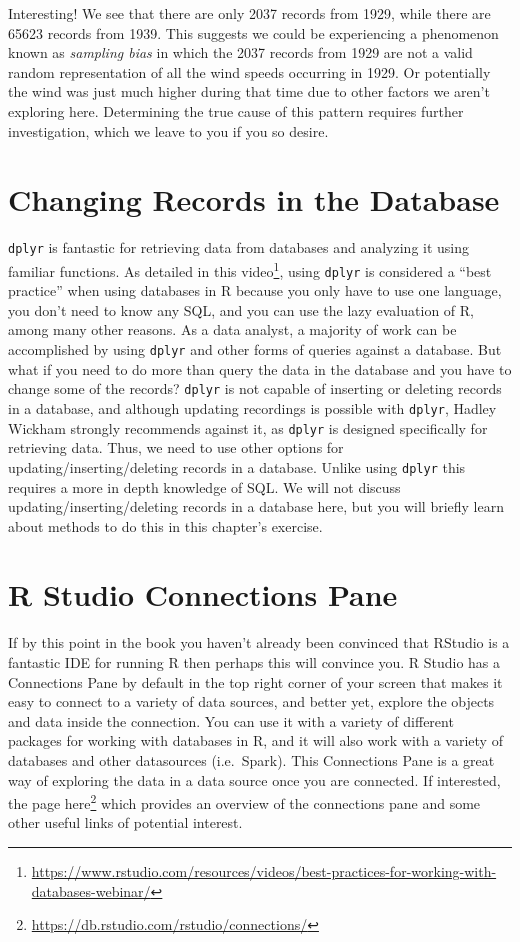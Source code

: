 \documentclass[
]{krantz}
\renewcommand{\href}[2]{#2\footnote{\url{#1}}}
\begin{document}
Interesting! We see that there are only 2037 records from 1929, while there are 65623 records from 1939. This suggests we could be experiencing a phenomenon known as \emph{sampling bias} in which the 2037 records from 1929 are not a valid random representation of all the wind speeds occurring in 1929. Or potentially the wind was just much higher during that time due to other factors we aren't exploring here. Determining the true cause of this pattern requires further investigation, which we leave to you if you so desire.

\hypertarget{changing-records-in-the-database}{%
\section{Changing Records in the Database}\label{changing-records-in-the-database}}

\texttt{dplyr} is fantastic for retrieving data from databases and analyzing it using familiar functions. As detailed in this \href{https://www.rstudio.com/resources/videos/best-practices-for-working-with-databases-webinar/}{video}, using \texttt{dplyr} is considered a ``best practice'' when using databases in R because you only have to use one language, you don't need to know any SQL, and you can use the lazy evaluation of R, among many other reasons. As a data analyst, a majority of work can be accomplished by using \texttt{dplyr} and other forms of queries against a database. But what if you need to do more than query the data in the database and you have to change some of the records? \texttt{dplyr} is not capable of inserting or deleting records in a database, and although updating recordings is possible with \texttt{dplyr}, Hadley Wickham strongly recommends against it, as \texttt{dplyr} is designed specifically for retrieving data. Thus, we need to use other options for updating/inserting/deleting records in a database. Unlike using \texttt{dplyr} this requires a more in depth knowledge of SQL. We will not discuss updating/inserting/deleting records in a database here, but you will briefly learn about methods to do this in this chapter's exercise.

\hypertarget{r-studio-connections-pane}{%
\section{R Studio Connections Pane}\label{r-studio-connections-pane}}

If by this point in the book you haven't already been convinced that RStudio is a fantastic IDE for running R then perhaps this will convince you. R Studio has a Connections Pane by default in the top right corner of your screen that makes it easy to connect to a variety of data sources, and better yet, explore the objects and data inside the connection. You can use it with a variety of different packages for working with databases in R, and it will also work with a variety of databases and other datasources (i.e.~Spark). This Connections Pane is a great way of exploring the data in a data source once you are connected. If interested, the page \href{https://db.rstudio.com/rstudio/connections/}{here} which provides an overview of the connections pane and some other useful links of potential interest.
\end{document}
